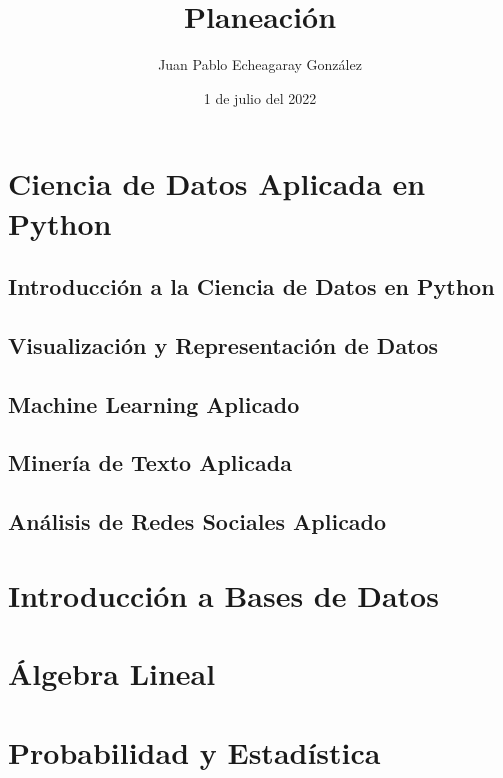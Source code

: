 \documentclass{article}
\title{Planeación}
\author{Juan Pablo Echeagaray González}
\date{1 de julio del 2022}
\begin{document}
    \begin{titlepage}
        \maketitle
    \end{titlepage}

    \tableofcontents
    \clearpage

    \section{Ciencia de Datos Aplicada en Python}

        \subsection{Introducción a la Ciencia de Datos en Python}

        \subsection{Visualización y Representación de Datos}

        \subsection{Machine Learning Aplicado}

        \subsection{Minería de Texto Aplicada}

        \subsection{Análisis de Redes Sociales Aplicado}

    \section{Introducción a Bases de Datos}

    \section{Álgebra Lineal}

    \section{Probabilidad y Estadística}
\end{document}
